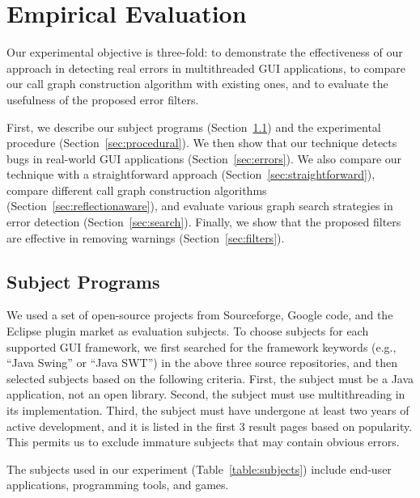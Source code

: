 
\tinystep
\section{Empirical Evaluation}
\label{sec:evaluation}

Our experimental objective is three-fold: to demonstrate the effectiveness
of our approach in detecting real errors in multithreaded GUI applications, to 
compare our call graph construction algorithm
with existing ones, and to evaluate the usefulness of the proposed 
error filters.  

First, we describe our subject programs (Section~\ref{sec:subjects}) and the experimental procedure (Section~\ref{sec:procedural}).
We then show that our technique detects bugs in real-world GUI applications (Section~\ref{sec:errors}).
We also compare our technique with
a straightforward approach (Section~\ref{sec:straightforward}),  compare
different call graph construction algorithms (Section~\ref{sec:reflectionaware}), and
evaluate various graph search strategies in error detection (Section~\ref{sec:search}).
 Finally, we show that the proposed filters are effective
in removing warnings (Section~\ref{sec:filters}). 



\subsection{Subject Programs}
\label{sec:subjects}


We used a set of open-source projects from Sourceforge, Google code,
and the Eclipse plugin
market as evaluation subjects. To choose subjects for each supported GUI framework,
we first searched for the framework keywords (e.g., ``Java Swing'' or ``Java SWT'')
in the above three source repositories, and then selected subjects based on the following
criteria. First, the subject must be a Java application, not
an open library. Second, the subject must use multithreading in its implementation.
Third, the subject must have undergone at least two years of active development,
and it is listed in the first 3 result pages based on popularity. This permits us
to exclude immature subjects that may contain obvious errors.

The subjects used in our experiment (Table~\ref{table:subjects})
include end-user applications, programming tools, and games. 


